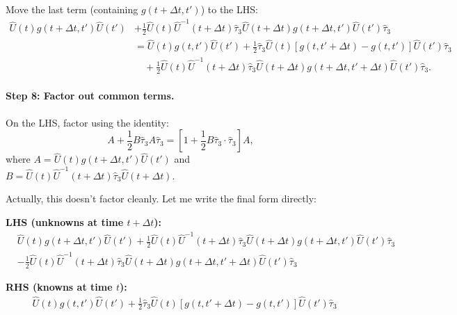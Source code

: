 \documentclass[11pt]{article}
\begin{document}
Move the last term (containing $g(t+\Delta t, t')$) to the LHS:
\begin{equation}
\begin{split}
\hat{U}(t) g(t+\Delta t, t') \hat{U}(t') &+ \frac{1}{2} \hat{U}(t) \hat{U}^{-1}(t+\Delta t) \hat{\tau}_3 \hat{U}(t+\Delta t) g(t+\Delta t, t') \hat{U}(t') \hat{\tau}_3 \\
&= \hat{U}(t) g(t, t') \hat{U}(t') + \frac{1}{2} \hat{\tau}_3 \hat{U}(t) [g(t, t'+\Delta t) - g(t, t')] \hat{U}(t') \hat{\tau}_3 \\
&\quad + \frac{1}{2} \hat{U}(t) \hat{U}^{-1}(t+\Delta t) \hat{\tau}_3 \hat{U}(t+\Delta t) g(t+\Delta t, t'+\Delta t) \hat{U}(t') \hat{\tau}_3.
\end{split}
\end{equation}

\paragraph{Step 8: Factor out common terms.}

On the LHS, factor using the identity:
\begin{equation}
A + \frac{1}{2} B \hat{\tau}_3 A \hat{\tau}_3 = \left[1 + \frac{1}{2} B \hat{\tau}_3 \cdot \hat{\tau}_3\right] A,
\end{equation}
where $A = \hat{U}(t) g(t+\Delta t, t') \hat{U}(t')$ and $B = \hat{U}(t) \hat{U}^{-1}(t+\Delta t) \hat{\tau}_3 \hat{U}(t+\Delta t)$.

Actually, this doesn't factor cleanly. Let me write the final form directly:

\textbf{LHS (unknowns at time $t+\Delta t$):}
\begin{equation}
\boxed{
\begin{split}
&\hat{U}(t) g(t+\Delta t, t') \hat{U}(t') + \frac{1}{2} \hat{U}(t) \hat{U}^{-1}(t+\Delta t) \hat{\tau}_3 \hat{U}(t+\Delta t) g(t+\Delta t, t') \hat{U}(t') \hat{\tau}_3 \\
&- \frac{1}{2} \hat{U}(t) \hat{U}^{-1}(t+\Delta t) \hat{\tau}_3 \hat{U}(t+\Delta t) g(t+\Delta t, t'+\Delta t) \hat{U}(t') \hat{\tau}_3
\end{split}
}
\end{equation}

\textbf{RHS (knowns at time $t$):}
\begin{equation}
\boxed{
\begin{split}
&\hat{U}(t) g(t, t') \hat{U}(t') + \frac{1}{2} \hat{\tau}_3 \hat{U}(t) [g(t, t'+\Delta t) - g(t, t')] \hat{U}(t') \hat{\tau}_3
\end{split}
}
\end{equation}
\end{document}
